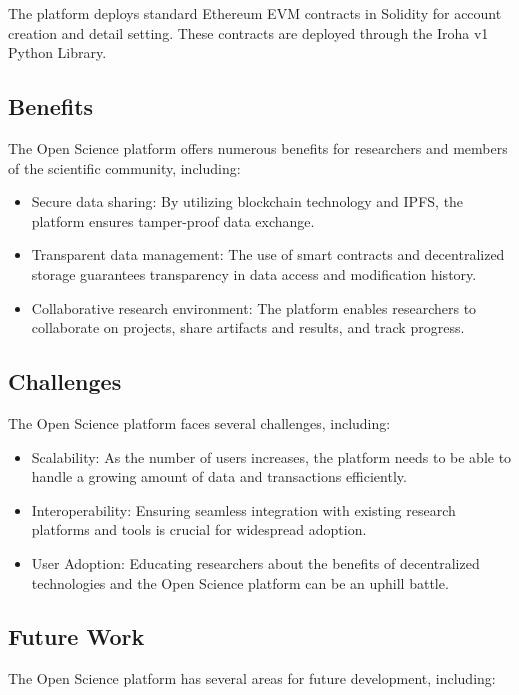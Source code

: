 \documentclass{article}
\begin{document}
The platform deploys standard Ethereum EVM contracts in Solidity for account creation and detail setting. These contracts are deployed through the Iroha v1 Python Library.

\subsection{Benefits}

The Open Science platform offers numerous benefits for researchers and members of the scientific community, including:

\begin{itemize}
      \item Secure data sharing: By utilizing blockchain technology and IPFS, the platform ensures tamper-proof data exchange.
      \item Transparent data management: The use of smart contracts and decentralized storage guarantees transparency in data access and modification history.
      \item Collaborative research environment: The platform enables researchers to collaborate on projects, share artifacts and results, and track progress.
\end{itemize}

\subsection{Challenges}

The Open Science platform faces several challenges, including:

\begin{itemize}
      \item Scalability: As the number of users increases, the platform needs to be able to handle a growing amount of data and transactions efficiently.
      \item Interoperability: Ensuring seamless integration with existing research platforms and tools is crucial for widespread adoption.
      \item User Adoption: Educating researchers about the benefits of decentralized technologies and the Open Science platform can be an uphill battle.
\end{itemize}

\subsection{Future Work}

The Open Science platform has several areas for future development, including:
\end{document}
